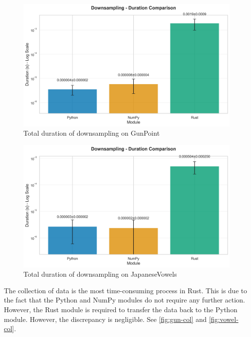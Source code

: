 \documentclass[review]{AIM_report}
\begin{document}
\begin{figure}[H]
    \centering
    \includegraphics[width=\figsize\textwidth]{files/benchmarking/methods_gunpoint/downsampling_comparison.png}
    \caption{Total duration of downsampling on GunPoint}
    \label{fig:gun-down}
\end{figure}
\begin{figure}[H]
    \centering
    \includegraphics[width=\figsize\textwidth]{files/benchmarking/methods_vowels/downsampling_comparison.png}
    \caption{Total duration of downsampling on JapaneseVowels}
    \label{fig:vowel-down}
\end{figure}

The collection of data is the most time-consuming process in Rust. This is due to the fact that the Python and NumPy modules do not require any further action. However, the Rust module is required to transfer the data back to the Python module. However, the discrepancy is negligible. See \autoref{fig:gun-col} and \autoref{fig:vowel-col}.
\end{document}
